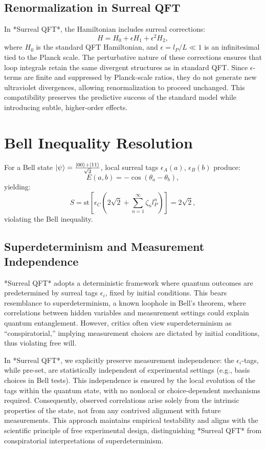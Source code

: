 \documentclass{article}
\begin{document}
\subsection{Renormalization in Surreal QFT}
In *Surreal QFT*, the Hamiltonian includes surreal corrections:
\begin{equation}
H = H_0 + \epsilon H_1 + \epsilon^2 H_2,
\end{equation}
where \(H_0\) is the standard QFT Hamiltonian, and \(\epsilon = l_P / L \ll 1\) is an infinitesimal tied to the Planck scale. The perturbative nature of these corrections ensures that loop integrals retain the same divergent structures as in standard QFT. Since \(\epsilon\)-terms are finite and suppressed by Planck-scale ratios, they do not generate new ultraviolet divergences, allowing renormalization to proceed unchanged. This compatibility preserves the predictive success of the standard model while introducing subtle, higher-order effects.

\section{Bell Inequality Resolution}
For a Bell state \(\ket{\psi} = \frac{\ket{00} + \ket{11}}{\sqrt{2}}\), local surreal tags \(\epsilon_A(a)\), \(\epsilon_B(b)\) produce:
\begin{equation}
E(a,b) = -\cos(\theta_a - \theta_b),
\end{equation}
yielding:
\begin{equation}
S = \text{st}\left[ \epsilon_C \left(2\sqrt{2} + \sum_{n=1}^\infty \zeta_n l_P^n\right) \right] = 2\sqrt{2},
\end{equation}
violating the Bell inequality.

\subsection{Superdeterminism and Measurement Independence}
*Surreal QFT* adopts a deterministic framework where quantum outcomes are predetermined by surreal tags \(\epsilon_i\), fixed by initial conditions. This bears resemblance to superdeterminism, a known loophole in Bell’s theorem, where correlations between hidden variables and measurement settings could explain quantum entanglement. However, critics often view superdeterminism as “conspiratorial,” implying measurement choices are dictated by initial conditions, thus violating free will.

In *Surreal QFT*, we explicitly preserve measurement independence: the \(\epsilon_i\)-tags, while pre-set, are statistically independent of experimental settings (e.g., basis choices in Bell tests). This independence is ensured by the local evolution of the tags within the quantum state, with no nonlocal or choice-dependent mechanisms required. Consequently, observed correlations arise solely from the intrinsic properties of the state, not from any contrived alignment with future measurements. This approach maintains empirical testability and aligns with the scientific principle of free experimental design, distinguishing *Surreal QFT* from conspiratorial interpretations of superdeterminism.
\end{document}
